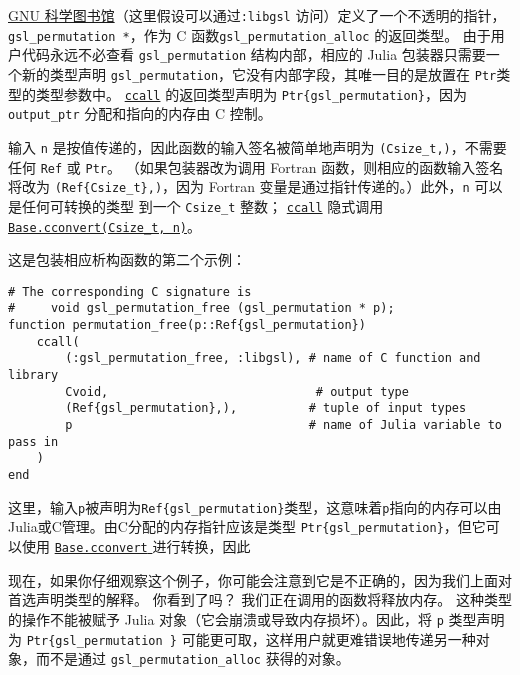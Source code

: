 \href{https://www.gnu.org/software/gsl/}{GNU 科学图书馆}（这里假设可以通过\texttt{:libgsl} 访问）定义了一个不透明的指针，\texttt{gsl\_permutation *}，作为 C 函数\texttt{gsl\_permutation\_alloc} 的返回类型。 由于用户代码永远不必查看 \texttt{gsl\_permutation} 结构内部，相应的 Julia 包装器只需要一个新的类型声明 \texttt{gsl\_permutation}，它没有内部字段，其唯一目的是放置在 \texttt{Ptr}类型的类型参数中。 \hyperlink{14245046751182637566}{\texttt{ccall}} 的返回类型声明为 \texttt{Ptr\{gsl\_permutation\}}，因为 \texttt{output\_ptr} 分配和指向的内存由 C 控制。



输入 \texttt{n} 是按值传递的，因此函数的输入签名被简单地声明为 \texttt{(Csize\_t,)}，不需要任何 \texttt{Ref} 或 \texttt{Ptr}。 （如果包装器改为调用 Fortran 函数，则相应的函数输入签名将改为 \texttt{(Ref\{Csize\_t\},)}，因为 Fortran 变量是通过指针传递的。）此外，\texttt{n} 可以是任何可转换的类型 到一个 \texttt{Csize\_t} 整数； \hyperlink{14245046751182637566}{\texttt{ccall}} 隐式调用 \hyperlink{16487788729383051927}{\texttt{Base.cconvert(Csize\_t, n)}}。



这是包装相应析构函数的第二个示例：




\begin{verbatim}
# The corresponding C signature is
#     void gsl_permutation_free (gsl_permutation * p);
function permutation_free(p::Ref{gsl_permutation})
    ccall(
        (:gsl_permutation_free, :libgsl), # name of C function and library
        Cvoid,                             # output type
        (Ref{gsl_permutation},),          # tuple of input types
        p                                 # name of Julia variable to pass in
    )
end
\end{verbatim}



这里，输入\texttt{p}被声明为\texttt{Ref\{gsl\_permutation\}}类型，这意味着\texttt{p}指向的内存可以由Julia或C管理。由C分配的内存指针应该是类型 \texttt{Ptr\{gsl\_permutation\}}，但它可以使用 \href{@ref}{\texttt{Base.cconvert} } 进行转换，因此



现在，如果你仔细观察这个例子，你可能会注意到它是不正确的，因为我们上面对首选声明类型的解释。 你看到了吗？ 我们正在调用的函数将释放内存。 这种类型的操作不能被赋予 Julia 对象（它会崩溃或导致内存损坏）。因此，将 \texttt{p} 类型声明为 \texttt{Ptr\{gsl\_permutation \}} 可能更可取，这样用户就更难错误地传递另一种对象，而不是通过 \texttt{gsl\_permutation\_alloc} 获得的对象。



